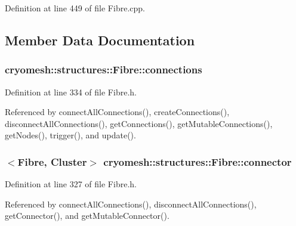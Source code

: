 \-Definition at line 449 of file \-Fibre.\-cpp.



\subsection{\-Member \-Data \-Documentation}
\hypertarget{classcryomesh_1_1structures_1_1Fibre_ac6b2267d1a4b1532345988eb29e55850}{
\subsubsection[{connections}]{ {\bf cryomesh\-::structures\-::\-Fibre\-::connections}}}\label{classcryomesh_1_1structures_1_1Fibre_ac6b2267d1a4b1532345988eb29e55850}


\-Definition at line 334 of file \-Fibre.\-h.



\-Referenced by connect\-All\-Connections(), create\-Connections(), disconnect\-All\-Connections(), get\-Connections(), get\-Mutable\-Connections(), get\-Nodes(), trigger(), and update().

\hypertarget{classcryomesh_1_1structures_1_1Fibre_a13214170b78c57278f800c82f2a063f7}{
\subsubsection[{connector}]{$<${\bf \-Fibre}, {\bf \-Cluster}$>$ {\bf cryomesh\-::structures\-::\-Fibre\-::connector}}}\label{classcryomesh_1_1structures_1_1Fibre_a13214170b78c57278f800c82f2a063f7}


\-Definition at line 327 of file \-Fibre.\-h.



\-Referenced by connect\-All\-Connections(), disconnect\-All\-Connections(), get\-Connector(), and get\-Mutable\-Connector().

